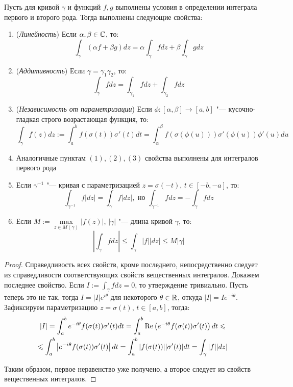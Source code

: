 \begin{theorem}
	Пусть для кривой $\gamma$ и функций $f, g$ выполнены условия в определении интеграла первого и второго рода. Тогда выполнены следующие свойства:
	\begin{enumerate}
		\item (\textit{Линейность}) Если $\alpha, \beta \in \mathbb{C}$, то:
		\[\int_{\gamma}(\alpha f+\beta g)dz = \alpha\int_\gamma fdz + \beta\int_\gamma gdz\]
		
		\item (\textit{Аддитивность}) Если $\gamma = \gamma_1\gamma_2$, то:
		\[\int_{\gamma}fdz = \int_{\gamma_1}fdz + \int_{\gamma_2}fdz\]
		
		\item (\textit{Независимость от параметризации}) Если $\phi : [\alpha, \beta] \to [a, b]$ "--- кусочно-гладкая строго возрастающая функция, то:
		\[\int_{\gamma}f(z)dz := \int_a^bf(\sigma(t))\sigma'(t)dt = \int_\alpha^\beta f(\sigma(\phi(u)))\sigma'(\phi(u))\phi'(u)du\]
		
		\item Аналогичные пунктам $(1), (2), (3)$ свойства выполнены для интегралов первого рода
		
		\item Если $\gamma^{-1}$ "--- кривая с параметризацией $z = \sigma(-t)$, $t \in [-b, -a]$, то:
		\[\int_{\gamma^{-1}}f|dz| = \int_\gamma f|dz|,\text{ но }\int_{\gamma^{-1}}fdz = -\int_\gamma fdz\]
		
		\item \label{int-estimation-max} Если $M := \max\limits_{z \in M(\gamma)}|f(z)|$, $|\gamma|$ "--- длина кривой $\gamma$, то:
		\[\left|\int_\gamma fdz\right| \le \int_\gamma|f||dz| \le M|\gamma|\]
	\end{enumerate}
\end{theorem}

\begin{proof}
	Справедливость всех свойств, кроме последнего, непосредственно следует из справедливости соответствующих свойств вещественных интегралов. Докажем последнее свойство. Если $I := \int_\gamma fdz = 0$, то утверждение тривиально. Пусть теперь это не так, тогда $I = |I|e^{i\theta}$ для некоторого $\theta \in \mathbb{R}$, откуда $|I| = Ie^{-i\theta}$. Зафиксируем параметризацию $z = \sigma(t)$, $t \in [a, b]$, тогда:
	\begin{multline*}
		|I| = \int_{a}^be^{-i\theta} f(\sigma(t))\sigma'(t)dt = \int_{a}^b\operatorname{Re}\left(e^{-i\theta} f(\sigma(t))\sigma'(t)\right)dt \leqslant \\
		\leqslant \int_{a}^b\left|e^{-i\theta} f(\sigma(t))\sigma'(t)\right|dt = \int_{a}^b|f(\sigma(t))||\sigma'(t)|dt = \int_\gamma |f||dz|
	\end{multline*}

	Таким образом, первое неравенство уже получено, а второе следует из свойств вещественных интегралов.
\end{proof}

